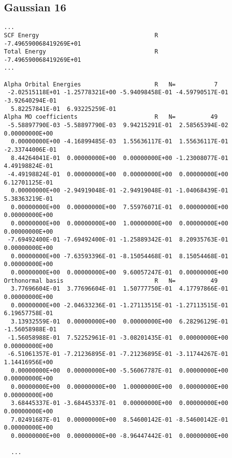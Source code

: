 \documentclass[12pt,a4paper,openany,twoside]{article}
\numberwithin{equation}{section}
\begin{document}
\subsection{Gaussian 16}
\begin{lstlisting}
...
SCF Energy                                 R     -7.496590068419269E+01
Total Energy                               R     -7.496590068419269E+01
...

Alpha Orbital Energies                     R   N=           7
 -2.02515118E+01 -1.25778321E+00 -5.94098458E-01 -4.59790517E-01 -3.92640294E-01
  5.82257841E-01  6.93225259E-01
Alpha MO coefficients                      R   N=          49
 -5.58897790E-03 -5.58897790E-03  9.94215291E-01  2.58565394E-02  0.00000000E+00
  0.00000000E+00 -4.16899485E-03  1.55636117E-01  1.55636117E-01 -2.33744006E-01
  8.44264041E-01  0.00000000E+00  0.00000000E+00 -1.23008077E-01  4.49198824E-01
 -4.49198824E-01  0.00000000E+00  0.00000000E+00  0.00000000E+00  6.12701125E-01
  0.00000000E+00 -2.94919048E-01 -2.94919048E-01 -1.04068439E-01  5.38363219E-01
  0.00000000E+00  0.00000000E+00  7.55976071E-01  0.00000000E+00  0.00000000E+00
  0.00000000E+00  0.00000000E+00  1.00000000E+00  0.00000000E+00  0.00000000E+00
 -7.69492400E-01 -7.69492400E-01 -1.25889342E-01  8.20935763E-01  0.00000000E+00
  0.00000000E+00 -7.63593396E-01 -8.15054468E-01  8.15054468E-01  0.00000000E+00
  0.00000000E+00  0.00000000E+00  9.60057247E-01  0.00000000E+00
Orthonormal basis                          R   N=          49
  3.77696604E-01  3.77696604E-01  1.50777750E-01  4.17797866E-01  0.00000000E+00
  0.00000000E+00 -2.04633236E-01 -1.27113515E-01 -1.27113515E-01  6.19657758E-01
  3.13932559E-01  0.00000000E+00  0.00000000E+00  6.28296129E-01 -1.56058988E-01
 -1.56058988E-01  7.52252961E-01 -3.08201435E-01  0.00000000E+00  0.00000000E+00
 -6.51061357E-01 -7.21236895E-01 -7.21236895E-01 -3.11744267E-01  1.14416956E+00
  0.00000000E+00  0.00000000E+00 -5.56067787E-01  0.00000000E+00  0.00000000E+00
  0.00000000E+00  0.00000000E+00  1.00000000E+00  0.00000000E+00  0.00000000E+00
  3.68445337E-01 -3.68445337E-01  0.00000000E+00  0.00000000E+00  0.00000000E+00
  7.02491687E-01  0.00000000E+00  8.54600142E-01 -8.54600142E-01  0.00000000E+00
  0.00000000E+00  0.00000000E+00 -8.96447442E-01  0.00000000E+00

  ...
\end{lstlisting}
\end{document}
